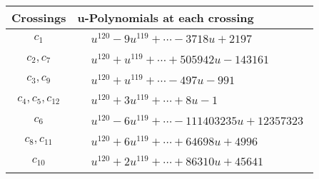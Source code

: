 \documentclass[1p]{elsarticle_modified}
\theoremstyle{definition}
\begin{document}
\begin{tabular}{m{50pt}|m{274pt}}
Crossings & \hspace{64pt}u-Polynomials at each crossing \\
\hline $$\begin{aligned}c_{1}\end{aligned}$$&$\begin{aligned}
&u^{120}-9 u^{119}+\cdots-3718 u+2197
\end{aligned}$\\
\hline $$\begin{aligned}c_{2},c_{7}\end{aligned}$$&$\begin{aligned}
&u^{120}+u^{119}+\cdots+505942 u-143161
\end{aligned}$\\
\hline $$\begin{aligned}c_{3},c_{9}\end{aligned}$$&$\begin{aligned}
&u^{120}+u^{119}+\cdots-497 u-991
\end{aligned}$\\
\hline $$\begin{aligned}c_{4},c_{5},c_{12}\end{aligned}$$&$\begin{aligned}
&u^{120}+3 u^{119}+\cdots+8 u-1
\end{aligned}$\\
\hline $$\begin{aligned}c_{6}\end{aligned}$$&$\begin{aligned}
&u^{120}-6 u^{119}+\cdots-111403235 u+12357323
\end{aligned}$\\
\hline $$\begin{aligned}c_{8},c_{11}\end{aligned}$$&$\begin{aligned}
&u^{120}+6 u^{119}+\cdots+64698 u+4996
\end{aligned}$\\
\hline $$\begin{aligned}c_{10}\end{aligned}$$&$\begin{aligned}
&u^{120}+2 u^{119}+\cdots+86310 u+45641
\end{aligned}$\\
\hline
\end{tabular}\\~\\
\end{document}
